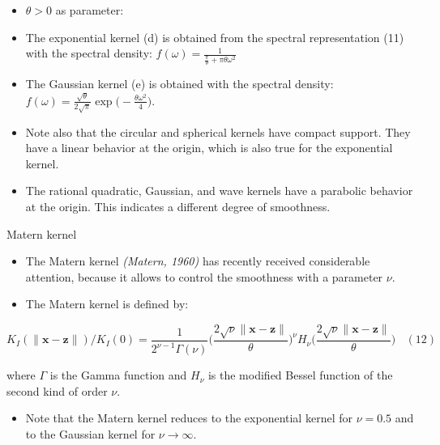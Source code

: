 \documentclass[
  ignorenonframetext,
]{beamer}
\providecommand{\tightlist}{%
  \setlength{\itemsep}{0pt}\setlength{\parskip}{0pt}}
\begin{document}
\begin{frame}{}
\protect\hypertarget{section-12}{}
\begin{itemize}
\item
  \(\theta > 0\) as parameter:
\item
  The exponential kernel (d) is obtained from the spectral
  representation (11) with the spectral density:
  \(f(\omega) = \frac 1 {{\frac \pi \theta} + \pi \theta\omega^2}\)
\item
  The Gaussian kernel (e) is obtained with the spectral density:
  \(f(\omega) = \frac {\sqrt \theta} {2\sqrt \pi} \exp \Big(-\frac {\theta\omega^2} 4\Big)\).
\item
  Note also that the circular and spherical kernels have compact
  support. They have a linear behavior at the origin, which is also true
  for the exponential kernel.
\item
  The rational quadratic, Gaussian, and wave kernels have a parabolic
  behavior at the origin. This indicates a different degree of
  smoothness.
\end{itemize}
\end{frame}

\begin{frame}{Matern kernel}
\protect\hypertarget{matern-kernel}{}
\begin{itemize}
\item
  The Matern kernel \emph{(Matern, 1960)} has recently received
  considerable attention, because it allows to control the smoothness
  with a parameter \(\nu\).
\item
  The Matern kernel is defined by:
\end{itemize}

\[
K_I(\|\pmb x - \pmb z\|)/K_I(0) = {\frac 1 {2^{\nu-1}\Gamma(\nu)}} \Big(\frac {2\sqrt \nu\|\pmb x - \pmb z\|} {\theta} \Big)^\nu H_\nu \Big(\frac {2\sqrt \nu\|\pmb x - \pmb z\|} {\theta} \Big) \ \ \ \ (12)
\]

where \(\Gamma\) is the Gamma function and \(H_\nu\) is the modified
Bessel function of the second kind of order \(\nu\).

\begin{itemize}
\tightlist
\item
  Note that the Matern kernel reduces to the exponential kernel for
  \(\nu = 0.5\) and to the Gaussian kernel for
  \(\nu \rightarrow \infty\).
\end{itemize}
\end{frame}
\end{document}
